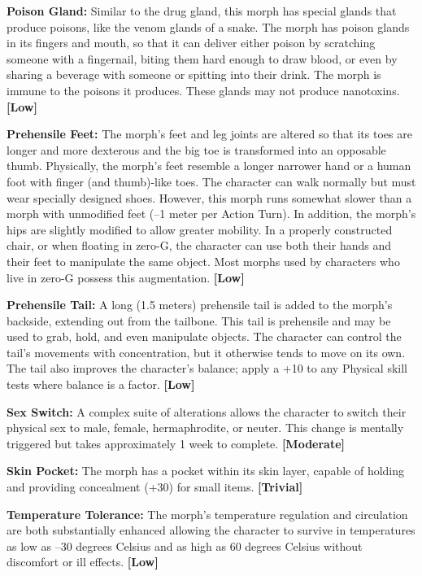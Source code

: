 \textbf{Poison Gland:} Similar to the drug gland, this 
morph has special glands that produce poisons, 
like the venom glands of a snake. The morph has 
poison glands in its fingers and mouth, so that it can 
deliver either poison by scratching someone with a 
fingernail, biting them hard enough to draw blood, 
or even by sharing a beverage with someone or spitting
into their drink. The morph is immune to the
poisons it produces. These glands may not produce 
nanotoxins. \textbf{[Low]}

\textbf{Prehensile Feet: }The morph's feet and leg joints are 
altered so that its toes are longer and more dexterous
and the big toe is transformed into an opposable
thumb. Physically, the morph's feet resemble a longer 
narrower hand or a human foot with finger  (and 
thumb)-like toes. The character can walk normally 
but must wear specially designed shoes. However, this 
morph runs somewhat slower than a morph with unmodified
feet (–1 meter per Action Turn). In addition,
the morph's hips are slightly modified to allow greater 
mobility. In a properly constructed chair, or when 
floating in zero-G, the character can use both their 
hands and their feet to manipulate the same object. 
Most morphs used by characters who live in zero-G 
possess this augmentation. \textbf{[Low]}

\textbf{Prehensile Tail:} A long (1.5 meters) prehensile 
tail is added to the morph's backside, extending out 
from the tailbone. This tail is prehensile and may 
be used to grab, hold, and even manipulate objects. 
The character can control the tail's movements with 
concentration, but it otherwise tends to move on its 
own. The tail also improves the character's balance; 
apply a +10 to any Physical skill tests where balance 
is a factor. \textbf{[Low]}

\textbf{Sex Switch:} A complex suite of alterations allows 
the character to switch their physical sex to male, 
female, hermaphrodite, or neuter. This change is 
mentally triggered but takes approximately 1 week to 
complete. \textbf{[Moderate]}

\textbf{Skin Pocket: }The morph has a pocket within its skin 
layer, capable of holding and providing concealment 
(+30) for small items. \textbf{[Trivial]}

\textbf{Temperature Tolerance: }The morph's temperature 
regulation and circulation are both substantially enhanced
allowing the character to survive in temperatures
as low as –30 degrees Celsius and as high as 60
degrees Celsius without discomfort or ill effects. \textbf{[Low]}

